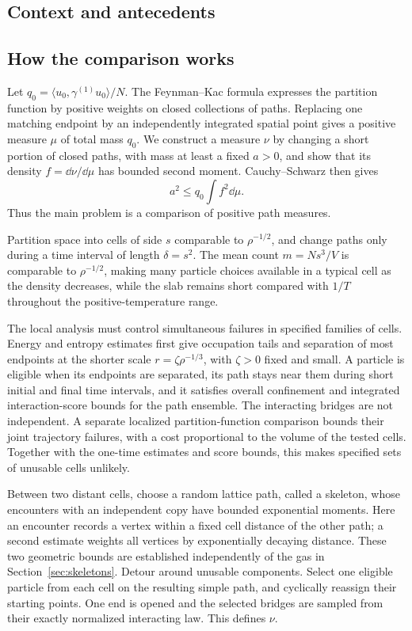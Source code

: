 \subsection{Context and antecedents}


\subsection{How the comparison works}

Let $q_0=\langle u_0,\gamma^{(1)}u_0\rangle/N$.
The Feynman--Kac formula expresses the partition function by positive
weights on closed collections of paths. Replacing one matching endpoint
by an independently integrated spatial point gives a positive measure
$\mu$ of total mass $q_0$. We construct a measure $\nu$ by changing a
short portion of closed paths, with mass at least a fixed $a>0$, and
show that its density $f=\dd\nu/\dd\mu$ has bounded second moment.
Cauchy--Schwarz then gives
\[
                    a^2\le q_0\int f^2\dd\mu.
\]
Thus the main problem is a comparison of positive path measures.

Partition space into cells of side $s$ comparable to $\rho^{-1/2}$,
and change paths only during a time interval of length $\delta=s^2$.
The mean count $m=Ns^3/V$ is comparable to $\rho^{-1/2}$, making
many particle choices available in a typical cell as the density decreases,
while the slab remains short compared with $1/T$ throughout the
positive-temperature range.

The local analysis must control simultaneous failures in specified
families of cells. Energy and entropy estimates first give occupation
tails and separation of most endpoints at the shorter scale
$r=\zeta\rho^{-1/3}$, with $\zeta>0$ fixed and small. A particle is
eligible when its endpoints are separated, its path stays near them
during short initial and final time intervals, and it satisfies overall
confinement and integrated interaction-score bounds for the path
ensemble. The interacting
bridges are not independent. A separate localized partition-function
comparison bounds their joint trajectory failures, with a cost
proportional to the volume of the tested cells. Together with the
one-time estimates and score bounds, this makes specified sets of
unusable cells unlikely.

Between two distant cells, choose a random lattice path, called a
skeleton, whose encounters with an independent copy have bounded
exponential moments. Here an encounter records a vertex within a
fixed cell distance of the other path; a second estimate weights all
vertices by exponentially decaying distance. These two geometric
bounds are established independently of the gas in
Section~\ref{sec:skeletons}. Detour around unusable components. Select one eligible particle from
each cell on the resulting simple path, and cyclically reassign their
starting points. One end is opened and the selected bridges are sampled
from their exactly normalized interacting law. This defines $\nu$.

